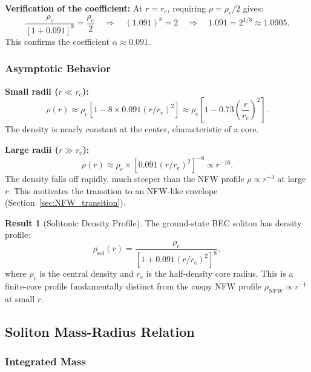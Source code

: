 \documentclass[11pt,a4paper]{article}
\newcommand{\rc}{\ensuremath{r_{\mathrm{c}}}}
\newcommand{\rhoc}{\ensuremath{\rho_{\mathrm{c}}}}
\theoremstyle{definition}
\newtheorem{result}{Result}[section]
\theoremstyle{remark}
\begin{document}
\textbf{Verification of the coefficient:} At $r = \rc$, requiring $\rho = \rhoc/2$ gives:
\begin{equation}
\frac{\rhoc}{[1 + 0.091]^8} = \frac{\rhoc}{2} \quad \Rightarrow \quad (1.091)^8 = 2 \quad \Rightarrow \quad 1.091 = 2^{1/8} \approx 1.0905.
\end{equation}
This confirms the coefficient $\alpha \approx 0.091$.

\subsubsection{Asymptotic Behavior}

\textbf{Small radii ($r \ll \rc$):}
\begin{equation}
\rho(r) \approx \rhoc[1 - 8 \times 0.091(r/\rc)^2] \approx \rhoc\left[1 - 0.73\left(\frac{r}{\rc}\right)^2\right].
\end{equation}
The density is nearly constant at the center, characteristic of a core.

\textbf{Large radii ($r \gg \rc$):}
\begin{equation}
\rho(r) \approx \rhoc \times [0.091(r/\rc)^2]^{-8} \propto r^{-16}.
\end{equation}
The density falls off rapidly, much steeper than the NFW profile $\rho \propto r^{-3}$ at large $r$. This motivates the transition to an NFW-like envelope (Section~\ref{sec:NFW_transition}).

\begin{result}[Solitonic Density Profile]
The ground-state BEC soliton has density profile:
\begin{equation}
\rho_{\mathrm{sol}}(r) = \frac{\rhoc}{\left[1 + 0.091\left(r/\rc\right)^2\right]^8},
\end{equation}
where $\rhoc$ is the central density and $\rc$ is the half-density core radius. This is a finite-core profile fundamentally distinct from the cuspy NFW profile $\rho_{\mathrm{NFW}} \propto r^{-1}$ at small $r$.
\end{result}

\subsection{Soliton Mass-Radius Relation}
\label{sec:mass_radius}

\subsubsection{Integrated Mass}
\end{document}
